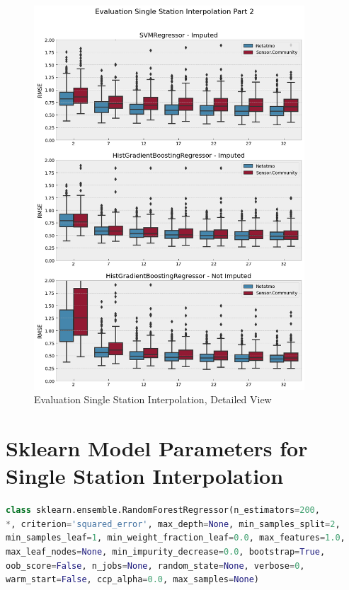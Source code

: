 \begin{figure}[ht]
    \centering
    \includegraphics[width=0.9\textwidth]{images/eval imputed vs not imputed part 2.png}
    \caption{Evaluation Single Station Interpolation, Detailed View}
    \label{fig:eval single station interpolation detailed part 2}
\end{figure}

\section{Sklearn Model Parameters for Single Station Interpolation}
\label{appendix: sklearn ml parameters single station}

\begin{lstlisting}[language=Python, caption=Random Forest Regressor Parameters]
class sklearn.ensemble.RandomForestRegressor(n_estimators=200,
*, criterion='squared_error', max_depth=None, min_samples_split=2,
min_samples_leaf=1, min_weight_fraction_leaf=0.0, max_features=1.0,
max_leaf_nodes=None, min_impurity_decrease=0.0, bootstrap=True,
oob_score=False, n_jobs=None, random_state=None, verbose=0,
warm_start=False, ccp_alpha=0.0, max_samples=None)
\end{lstlisting}

